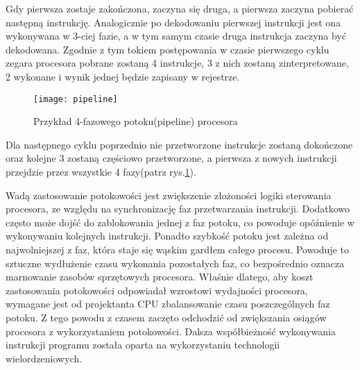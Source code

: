 \documentclass[document.tex]{subfiles}
\begin{document}
Gdy pierwsza zostaje zakończona, zaczyna się druga, a pierwsza
zaczyna pobierać następną instrukcję. Analogicznie po dekodowaniu pierwszej instrukcji jest ona wykonywana w 3-ciej fazie, a w tym samym czasie druga instrukcja zaczyna być dekodowana. Zgodnie z tym tokiem postępowania w czasie pierwszego cyklu zegara procesora pobrane zostaną 4 instrukcje, 3 z nich zostaną zinterpretowane, 2 wykonane i wynik jednej będzie zapisany w rejestrze.
\begin{figure}[h]
\texttt{[image: pipeline]}
\caption{Przykład 4-fazowego potoku(pipeline) procesora \protect\cite{Inside_Machine}}
\label{fig:pipeline}
\end{figure}
Dla następnego cyklu poprzednio 
nie przetworzone instrukcje zostaną dokończone oraz kolejne 3 zostaną częściowo przetworzone, a pierwsza z nowych instrukcji przejdzie przez wszystkie 4 fazy(patrz rys.\ref{fig:pipeline}).
\cite{Inside_Machine}\cite{Computer_Architecture_Patterson_Hennesy} 


Wadą zastosowanie potokowości jest zwiększenie złożoności logiki sterowania procesora, ze względu na synchronizację faz przetwarzania instrukcji. Dodatkowo często może dojść do zablokowania jednej z faz potoku, co powoduje opóźnienie w wykonywaniu kolejnych instrukcji. Ponadto szybkość potoku jest zależna od najwolniejszej z faz, która staje się wąskim gardłem całego procesu. Powoduje to sztuczne wydłużenie czasu wykonania pozostałych faz, co bezpośrednio oznacza marnowanie zasobów sprzętowych procesora. Właśnie dlatego, aby koszt zastosowania 
potokowości odpowiadał wzrostowi wydajności procesora, wymagane jest od projektanta CPU zbalansowanie czasu poszczególnych faz potoku. Z tego powodu z czasem zaczęto odchodzić od zwiększania osiągów procesora z wykorzystaniem potokowości. Dalsza współbieżność wykonywania instrukcji programu została oparta na wykorzystaniu technologii wielordzeniowych.\cite{Inside_Machine}\cite{Computer_Architecture_Patterson_Hennesy} 
\end{document}
